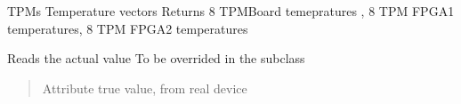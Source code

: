 \documentclass[letterpaper,10pt,english]{sphinxmanual}
\begin{document}
\begin{fulllineitems}
\label{\detokenize{webserverdocs:subrack_hardware.TPM_Temperatures}}
\pysigstartsignatures
{}
\pysigstopsignatures
\sphinxAtStartPar
TPMs Temperature vectors
Returns 8 TPMBoard temepratures , 8 TPM FPGA1 temperatures, 8 TPM FPGA2 temperatures

\begin{fulllineitems}
\label{\detokenize{webserverdocs:subrack_hardware.TPM_Temperatures.read_value}}
\pysigstartsignatures
{}
\pysigstopsignatures
\sphinxAtStartPar
Reads the actual value
To be overrided in the subclass
\begin{quote}\begin{description}
\sphinxAtStartPar
Attribute true value, from real device

\end{description}\end{quote}

\end{fulllineitems}


\end{fulllineitems}

\end{document}
